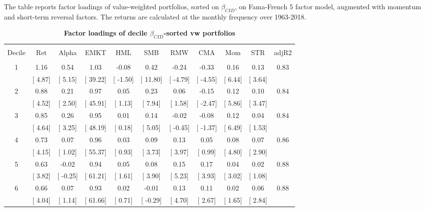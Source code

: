 \documentclass[12pt]{article}
\begin{document}
\begin{table}[!htbp] \centering 
  \caption{\textbf{Factor loadings of decile $\beta_{CID}$-sorted vw portfolios}} 
  \label{} 
  \begin{flushleft}
    {\medskip\small
 The table reports factor loadings of value-weighted portfolios, sorted on $\beta_{CID}$, on Fama-French 5 factor model, augmented with momentum and short-term reversal factors. The returns are calculated at the monthly frequency over 1963-2018.}
    \medskip
    \end{flushleft}
\begin{tabular}{@{\extracolsep{0pt}} ccccccccccc} 
\\[-1.8ex]\hline 
\hline \\[-1.8ex] 
Decile & Ret & Alpha & EMKT & HML & SMB & RMW & CMA & Mom & STR & adjR2 \\ 
\hline \\[-1.8ex] 
1 & 1.16 & 0.54 & 1.03 & -0.08 & 0.42 & -0.24 & -0.33 & 0.16 & 0.13 & 0.83 \\ 
 & [ 4.87] & [ 5.15] & [ 39.22] & [ -1.50] & [ 11.80] & [ -4.79] & [ -4.55] & [ 6.44] & [ 3.64] &  \\ 
2 & 0.88 & 0.21 & 0.97 & 0.05 & 0.23 & 0.06 & -0.15 & 0.12 & 0.10 & 0.84 \\ 
 & [ 4.52] & [ 2.50] & [ 45.91] & [ 1.13] & [ 7.94] & [ 1.58] & [ -2.47] & [ 5.86] & [ 3.47] &  \\ 
3 & 0.85 & 0.26 & 0.95 & 0.01 & 0.14 & -0.02 & -0.08 & 0.12 & 0.04 & 0.84 \\ 
 & [ 4.64] & [ 3.25] & [ 48.19] & [ 0.18] & [ 5.05] & [ -0.45] & [ -1.37] & [ 6.49] & [ 1.53] &  \\ 
4 & 0.73 & 0.07 & 0.96 & 0.03 & 0.09 & 0.13 & 0.05 & 0.08 & 0.07 & 0.86 \\ 
 & [ 4.15] & [ 1.02] & [ 55.37] & [ 0.93] & [ 3.73] & [ 3.97] & [ 0.99] & [ 4.80] & [ 2.90] &  \\ 
5 & 0.63 & -0.02 & 0.94 & 0.05 & 0.08 & 0.15 & 0.17 & 0.04 & 0.02 & 0.88 \\ 
 & [ 3.82] & [ -0.25] & [ 61.21] & [ 1.61] & [ 3.90] & [ 5.23] & [ 3.93] & [ 3.02] & [ 1.08] &  \\ 
6 & 0.66 & 0.07 & 0.93 & 0.02 & -0.01 & 0.13 & 0.11 & 0.02 & 0.06 & 0.88 \\ 
 & [ 4.04] & [ 1.14] & [ 61.66] & [ 0.71] & [ -0.29] & [ 4.70] & [ 2.67] & [ 1.65] & [ 2.84] &  \\ 

\end{tabular}
\end{table}
\end{document}
